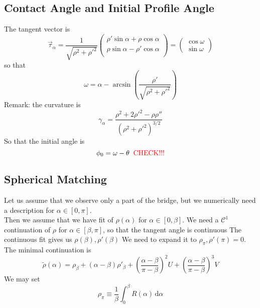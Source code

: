 \documentclass[aps,onecolumn]{revtex4}
\begin{document}
\subsection{Contact Angle and Initial Profile Angle}
The   tangent vector is
\begin{equation}
	\vec{\tau}_\alpha = 
	\dfrac{1}{\sqrt{\rho^2+\rho'^2}}
	\begin{pmatrix}
		\rho'\sin\alpha+\rho\cos\alpha\\
		\rho\sin\alpha - \rho'\cos\alpha\\
	\end{pmatrix}
 = 
 	\begin{pmatrix}
	\cos\omega\\
	\sin\omega
	\end{pmatrix}
\end{equation}
so that
\begin{equation}
	\omega = \alpha - \arcsin\left(\dfrac{\rho'}{\sqrt{\rho^2+\rho'^2}}\right)
\end{equation}
Remark: the curvature is
\begin{equation}
	\gamma_\alpha = \dfrac{\rho^2 + 2\rho'^2 - \rho\rho''}{\left(\rho^2+\rho'^2\right)^{3/2}}
\end{equation}
So that the initial angle is
\begin{equation}
	\phi_0 = \omega - \theta \;\; \text{\textcolor{red}{CHECK!!!}}
\end{equation}


\subsection{Spherical Matching}
Let us assume that we observe only a part of the bridge, but we numerically need
a description for $\alpha\in[0,\pi]$.\\

Then we assume that we have fit of $\rho(\alpha)$ for $\alpha\in[0,\beta]$.
We need a $\mathcal{C}^1$ continuation of $\rho$ for $\alpha\in[\beta,\pi]$, so
that the tangent angle is continuous
The continuous fit gives us $\rho(\beta),\rho'(\beta)$
We need to expand it to $\rho_\pi,\rho'(\pi)=0$.
The minimal continuation is
\begin{equation}
	\tilde{\rho}(\alpha) = \rho_\beta + \left(\alpha-\beta\right) \rho'_\beta
	+ \left(\dfrac{\alpha-\beta}{\pi-\beta}\right)^2 U + \left(\dfrac{\alpha-\beta}{\pi-\beta}\right)^3 V
\end{equation}
We may set 
\begin{equation}
	\rho_\pi \equiv \dfrac{1}{\beta}\int_0^\beta R(\alpha)\,\mathrm{d}\alpha
\end{equation}
\end{document}
